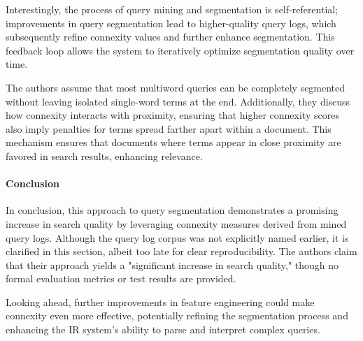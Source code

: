 Interestingly, the process of query mining and segmentation is self-referential; improvements in query segmentation lead to higher-quality query logs, which subsequently refine connexity values and further enhance segmentation. This feedback loop allows the system to iteratively optimize segmentation quality over time.

The authors assume that most multiword queries can be completely segmented without leaving isolated single-word terms at the end. Additionally, they discuss how connexity interacts with proximity, ensuring that higher connexity scores also imply penalties for terms spread farther apart within a document. This mechanism ensures that documents where terms appear in close proximity are favored in search results, enhancing relevance.

\paragraph*{Conclusion}
In conclusion, this approach to query segmentation demonstrates a promising increase in search quality by leveraging connexity measures derived from mined query logs. Although the query log corpus was not explicitly named earlier, it is clarified in this section, albeit too late for clear reproducibility. The authors claim that their approach yields a "significant increase in search quality," though no formal evaluation metrics or test results are provided.

Looking ahead, further improvements in feature engineering could make connexity even more effective, potentially refining the segmentation process and enhancing the IR system's ability to parse and interpret complex queries.
